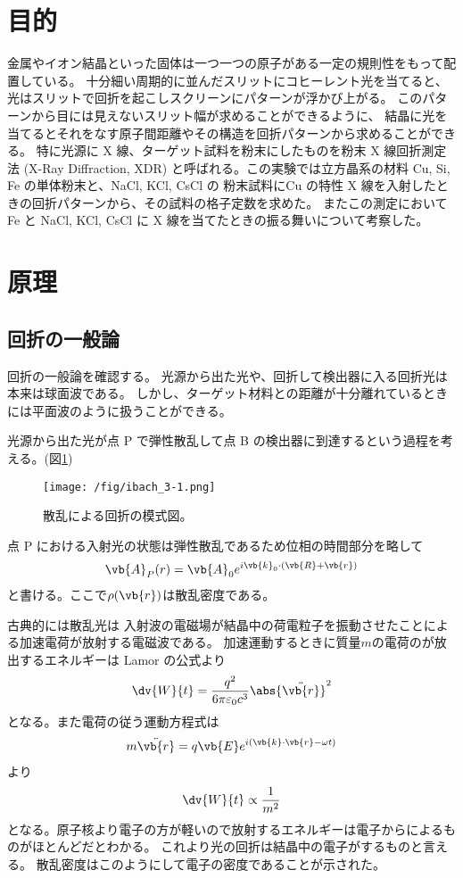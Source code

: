\documentclass[11pt,dvipdfmx,a4paper]{jsarticle}
\begin{document}
\section{目的}
金属やイオン結晶といった固体は一つ一つの原子がある一定の規則性をもって配置している。
十分細い周期的に並んだスリットにコヒーレント光を当てると、
光はスリットで回折を起こしスクリーンにパターンが浮かび上がる。
このパターンから目には見えないスリット幅が求めることができるように、
結晶に光を当てるとそれをなす原子間距離やその構造を回折パターンから求めることができる。
特に光源に X 線、ターゲット試料を粉末にしたものを粉末 X 線回折測定法 (X-Ray Diffraction, XDR)
と呼ばれる。この実験では立方晶系の材料 Cu, Si, Fe の単体粉末と、NaCl, KCl, CsCl の
粉末試料にCu の特性 X 線を入射したときの回折パターンから、その試料の格子定数を求めた。
またこの測定において Fe と NaCl, KCl, CsCl に X 線を当てたときの振る舞いについて考察した。

\section{原理}
\subsection{回折の一般論}
回折の一般論を確認する。
光源から出た光や、回折して検出器に入る回折光は本来は球面波である。
しかし、ターゲット材料との距離が十分離れているときには平面波のように扱うことができる。

光源から出た光が点 P で弾性散乱して点 B の検出器に到達するという過程を考える。(図\ref{ibach_fig3-1})
\begin{figure}[H]
	\centering
	\texttt{[image: /fig/ibach\_3-1.png]}
	\caption{散乱による回折の模式図。\cite{ibach-luth}}
	\label{ibach_fig3-1}
\end{figure}
点 P における入射光の状態は弾性散乱であるため位相の時間部分を略して
\begin{align}
	\vb{A}_P(r) = \vb{A}_0e^{i\vb{k}_0\cdot(\vb{R}+\vb{r})}
\end{align}
と書ける。ここで\(\rho(\vb{r})\)は散乱密度である。

古典的には散乱光は
入射波の電磁場が結晶中の荷電粒子を振動させたことによる加速電荷が放射する電磁波である。
加速運動するときに質量\(m\)の電荷のが放出するエネルギーは Lamor の公式より
\begin{align}
	\dv{W}{t} = \frac{q^2}{6\pi\varepsilon_0c^3}\abs{\ddot{\vb{r}}}^2
\end{align}
となる。また電荷の従う運動方程式は
\begin{align}
	m\ddot{\vb{r}} = q\vb{E} e^{i(\vb{k}\cdot \vb{r} -\omega t)}
\end{align}
より
\begin{align}
	\dv{W}{t} \propto \frac{1}{m^2}
\end{align}
となる。原子核より電子の方が軽いので放射するエネルギーは電子からによるものがほとんどだとわかる。
これより光の回折は結晶中の電子がするものと言える。
散乱密度はこのようにして電子の密度であることが示された。
\end{document}
